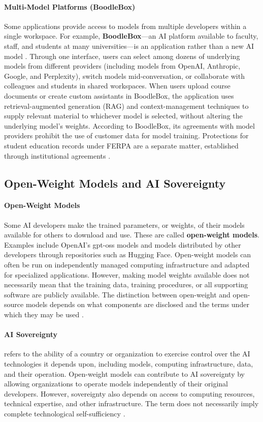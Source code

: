 \documentclass[11pt]{article}
\begin{document}
\paragraph{Multi-Model Platforms (BoodleBox)}
Some applications provide access to models from multiple developers within a single workspace.
For example, \textbf{BoodleBox}---an AI platform available to faculty, staff, and students at many universities---is an application rather than a new AI model \citep{BoodleBox2026}.
Through one interface, users can select among dozens of underlying models from different providers
(including models from OpenAI, Anthropic, Google, and Perplexity),
switch models mid-conversation, or collaborate with colleagues and students in shared workspaces. When users upload course documents or create custom assistants in BoodleBox, the application uses retrieval-augmented generation (RAG) and context-management techniques to supply relevant material to whichever model is selected, without altering the underlying model's weights. According to BoodleBox, its agreements with model providers prohibit the use of customer data for model training. Protections for student education records under FERPA are a separate matter, established through institutional agreements \citep{BoodleBox2026}.

\subsection{Open-Weight Models and AI Sovereignty}

\paragraph{Open-Weight Models}
Some AI developers make the trained parameters, or weights, of their models available for others to download and use. These are called \textbf{open-weight models}. Examples include OpenAI's gpt-oss models and models distributed by other developers through repositories such as Hugging Face. Open-weight models can often be run on independently managed computing infrastructure and adapted for specialized applications. However, making model weights available does not necessarily mean that the training data, training procedures, or all supporting software are publicly available. The distinction between open-weight and open-source models depends on what components are disclosed and the terms under which they may be used \citep{OpenAI2025GPTOSS}.


\paragraph{AI Sovereignty} refers to the ability of a country or organization to exercise control over the AI technologies it depends upon, including models, computing infrastructure, data, and their operation. Open-weight models can contribute to AI sovereignty by allowing organizations to operate models independently of their original developers. However, sovereignty also depends on access to computing resources, technical expertise, and other infrastructure. The term does not necessarily imply complete technological self-sufficiency \citep{Brookings2026Sovereignty}.
\end{document}
